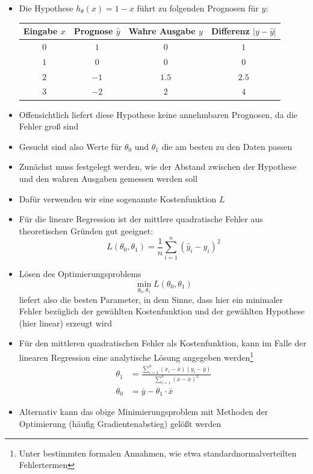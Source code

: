 \begin{frame}
\begin{itemize}[<+->]
\item Die Hypothese $h_\theta(x) = 1 - x $ führt zu folgenden Prognosen für $y$:\\[0.1cm]
\begin{tabular}{c|c|c|c}
Eingabe $x$ & Prognose $\hat{y}$ & Wahre Ausgabe $y$ & Differenz $\vert y - \hat{y}\vert$ \\ 
\hline 
$0$ & $1$ & $0$ & $1$ \\ 
$1$ & $0$ & $0$ & $0$ \\ 
$2$ & $-1$ & $1.5$ & $2.5$ \\  
$3$ & $-2$ & $2$ & $4$ \\  
\end{tabular}
\item Offensichtlich liefert diese Hypothese keine annehmbaren Prognosen, da die Fehler groß sind
\item Gesucht sind also Werte für $\theta_0$ und $\theta_1$ die \glqq am besten\grqq{} zu den Daten passen
\item Zunächst muss festgelegt werden, wie der Abstand zwischen der Hypothese und den wahren Ausgaben gemessen werden soll
\item Dafür verwenden wir eine sogenannte Kostenfunktion $L$
\item Für die lineare Regression ist der mittlere quadratische Fehler aus theoretischen Gründen gut geeignet:
\[ L(\theta_0,\theta_1) = \frac{1}{n}\sum_{i=1}^n (\hat{y}_i - y_i)^2 \]
\end{itemize}
\end{frame}
\begin{frame}
\begin{itemize}[<+->]
\item Lösen des Optimierungsproblems 
\[ \min\limits_{\theta_0,\theta_1} L(\theta_0,\theta_1) \]
liefert also die \glqq besten\grqq{} Parameter, in dem Sinne, dass hier ein minimaler Fehler bezüglich der gewählten Kostenfunktion und der gewählten Hypothese (hier linear) erzeugt wird
\item Für den mittleren quadratischen Fehler als Kostenfunktion, kann im Falle der linearen Regression eine analytische Lösung angegeben werden\footnote{Unter bestimmten formalen Annahmen, wie etwa standardnormalverteilten Fehlertermen}
\begin{align*}
\theta_1 &= \frac{\sum_{i=1}^n (x_i - \bar{x})(y_i - \bar{y})}{\sum_{i=1}^n (x-\bar{x})^2}\\
\theta_0 &= \bar{y} - \theta_1\cdot \bar{x}
\end{align*}
\item Alternativ kann das obige Minimierungsproblem mit Methoden der Optimierung (häufig Gradientenabstieg) gelößt werden
\end{itemize}
\end{frame}
